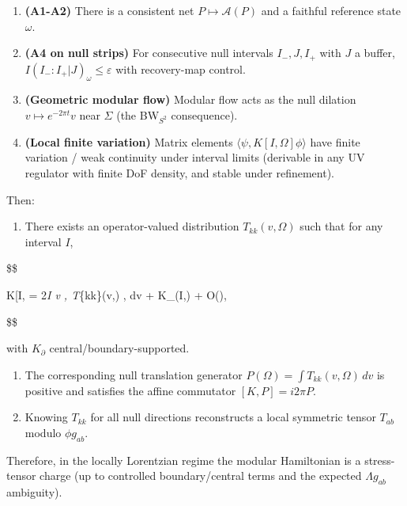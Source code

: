 \documentclass[11pt,a4paper]{article}
\theoremstyle{remark}
\providecommand{\tightlist}{%
  \setlength{\itemsep}{0pt}\setlength{\parskip}{0pt}}
\begin{document}
\begin{enumerate}
\def\labelenumi{\arabic{enumi}.}
\tightlist
\item
  \textbf{(A1-A2)} There is a consistent net \(P \mapsto \mathcal{A}(P)\) and a
  faithful reference state \(\omega\).
\item
  \textbf{(A4 on null strips)} For consecutive null intervals \(I_-, J, I_+\)
  with \(J\) a buffer, \(I(I_-:I_+|J)_\omega \le \varepsilon\) with
  recovery-map control.
\item
  \textbf{(Geometric modular flow)} Modular flow acts as the null dilation
  \(v \mapsto e^{-2\pi t} v\) near \(\Sigma\) (the BW\(_{S^2}\) consequence).
\item
  \textbf{(Local finite variation)} Matrix elements
  \(\langle \psi, K[I,\Omega] \phi \rangle\) have finite variation / weak
  continuity under interval limits (derivable in any UV regulator with
  finite DoF density, and stable under refinement).
\end{enumerate}

Then:

\begin{enumerate}
\def\labelenumi{(\alph{enumi})}
\tightlist
\item
  There exists an operator-valued distribution \(T_{kk}(v,\Omega)\) such
  that for any interval \(I\),
\end{enumerate}

\$\$

K{[}I,\Omega{]} = 2\pi \int\emph{I v , T}\{kk\}(v,\Omega) , dv + K\_\partial(I,\Omega) + O(\varepsilon),

\$\$

with \(K_\partial\) central/boundary-supported.

\begin{enumerate}
\def\labelenumi{(\alph{enumi})}
\setcounter{enumi}{1}
\item
  The corresponding null translation generator
  \(P(\Omega) = \int T_{kk}(v,\Omega) \, dv\) is positive and satisfies
  the affine commutator \([K,P] = i 2\pi P\).
\item
  Knowing \(T_{kk}\) for all null directions reconstructs a local
  symmetric tensor \(T_{ab}\) modulo \(\phi g_{ab}\).
\end{enumerate}

Therefore, in the locally Lorentzian regime the modular Hamiltonian is a
stress-tensor charge (up to controlled boundary/central terms and the
expected \(\Lambda g_{ab}\) ambiguity).
\end{document}
